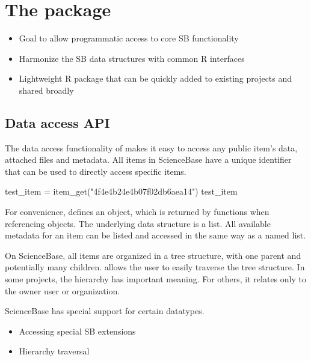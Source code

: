 
\section{The  package}
\begin{itemize}
	\item{Goal to allow programmatic access to core SB functionality}
	\item{Harmonize the SB data structures with common R interfaces}
	\item{Lightweight R package that can be quickly added to existing projects and shared broadly}
\end{itemize}



\subsection{Data access API}
The data access functionality of  makes it easy to 
access any public item's data, attached files and metadata. All items
in ScienceBase have a unique identifier that can be used to directly 
access specific items. 

\begin{example}
test_item = item_get("4f4e4b24e4b07f02db6aea14")
test_item
\end{example}

For convenience,  defines an  object, which is 
returned by  functions when referencing objects. The underlying
data structure is a list. All available metadata for an item can be listed
and accessed in the same way as a named list.


On ScienceBase, all items are organized in a tree structure, with one 
parent and potentially many children.  allows the user to 
easily traverse the tree structure. In some projects, the hierarchy has 
important meaning. For others, it relates only to the owner user or
organization.


ScienceBase has special support for certain datatypes. 


\begin{itemize}
	\item{Accessing special SB extensions}
	\item{Hierarchy traversal}
\end{itemize}


